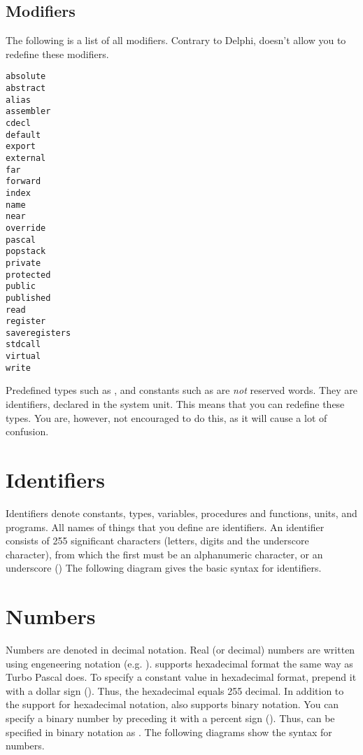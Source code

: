 \documentclass{report}
\begin{document}
\subsection{Modifiers}
The following is a list of all modifiers. Contrary to Delphi, \fpc doesn't
allow you to redefine these modifiers.
\begin{multicols}{4}
\begin{verbatim}
absolute
abstract
alias
assembler
cdecl
default
export
external
far
forward
index
name
near
override
pascal
popstack
private
protected
public
published
read
register
saveregisters
stdcall
virtual
write
\end{verbatim}
\end{multicols}
\begin{remark}
Predefined types such as ,  and constants
such as  are {\em not} reserved words. They are
identifiers, declared in the system unit. This means that you can redefine
these types. You are, however, not encouraged to do this, as it will cause
a lot of confusion.
\end{remark}

\section{Identifiers}
Identifiers denote constants, types, variables, procedures and functions,
units, and programs. All names of things that you define are identifiers.
An identifier consists of 255 significant characters (letters, digits and
the underscore character), from which the first must be an alphanumeric
character, or an underscore (\var{\_})
The following diagram gives the basic syntax for identifiers.


\section{Numbers}
Numbers are denoted in decimal notation. Real (or decimal) numbers are
written using engeneering notation (e.g. ).
\fpc supports hexadecimal format the same way as Turbo Pascal does. To
specify a constant value in hexadecimal format, prepend it with a dollar
sign (\var{\$}). Thus, the hexadecimal  equals 255 decimal.
In addition to the support for hexadecimal notation, \fpc also supports
binary notation. You can specify a binary number by preceding it with a
percent sign (\var{\%}). Thus,  can be specified in binary notation
as .
The following diagrams show the syntax for numbers.

\end{document}
